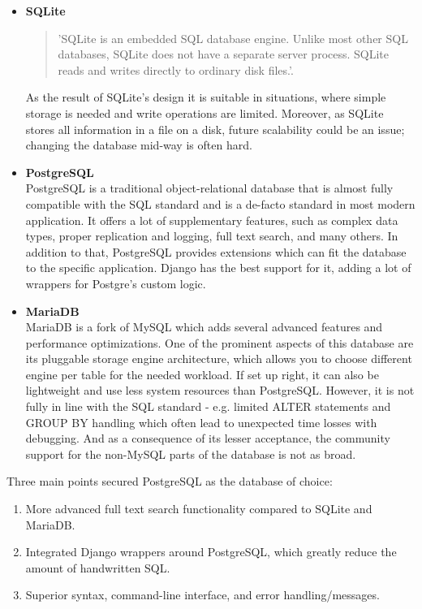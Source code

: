 \begin{itemize}
    \item \textbf{SQLite} \\
    \begin{quote}
        'SQLite is an embedded SQL database engine.
        Unlike most other SQL databases, SQLite does not have a separate
        server process. SQLite reads and writes directly to ordinary disk
        files.'\cite{sqlite}.
    \end{quote}
    As the result of SQLite's design it is suitable
    in situations, where simple storage is needed and write operations are limited.
    Moreover, as SQLite stores all information in a file on a disk, future scalability could be an issue;
    changing the database mid-way is often hard.

    \item \textbf{PostgreSQL} \\
    PostgreSQL is a traditional object-relational database that is almost fully compatible with the SQL standard
    and is a de-facto standard in most modern application. It offers a lot of supplementary features,
    such as complex data types, proper replication and logging, full text search, and many others.
    In addition to that, PostgreSQL provides extensions which can fit the database to the specific application.
    \cite{postgres}
    Django has the best support for it, adding a lot of wrappers for Postgre's custom logic.\cite{django_postgres}

    \item \textbf{MariaDB} \\
    MariaDB is a fork of MySQL which adds several advanced features and performance optimizations.
    One of the prominent aspects of this database are its pluggable storage engine architecture,
    which allows you to choose different engine per table for the needed workload.\cite{mariadb}
    If set up right, it can also be lightweight and use less system resources than PostgreSQL.
    However, it is not fully in line with the SQL standard -
    e.g. limited ALTER statements and GROUP BY handling\cite{dbfunctions} which often lead to unexpected time losses
    with debugging.
    And as a consequence of its lesser acceptance\cite{dbrank},
    the community support for the non-MySQL parts of the database is not as broad.
\end{itemize}
Three main points secured PostgreSQL as the database of choice:
\begin{enumerate}
    \item More advanced full text search functionality compared to SQLite and MariaDB.
    \item Integrated Django wrappers around PostgreSQL, which greatly reduce the amount of handwritten SQL.
    \item Superior syntax, command-line interface, and error handling/messages.
\end{enumerate}

